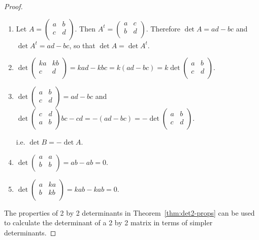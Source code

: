 \documentclass[11pt,a4paper]{article}
\theoremstyle{definition}
\begin{document}
\begin{proof}
\begin{enumerate}
\item Let $
A=
\begin{pmatrix}
a&b\\c&d\\
\end{pmatrix}
$. Then $A^t=
\begin{pmatrix}
a&c\\b&d\\
\end{pmatrix}
$. Therefore $\det A=ad-bc$ and $\det A^t=ad-bc$, so that $\det A=\det A^t$.
\item $\det
\begin{pmatrix}
ka&kb\\c&d\\
\end{pmatrix}
=kad-kbc=k(ad-bc)=
k\det
\begin{pmatrix}
a&b\\c&d\\
\end{pmatrix}
$.
\item $\det
\begin{pmatrix}
a&b\\c&d\\
\end{pmatrix}
=ad-bc
$ and $\det
\begin{pmatrix}
c&d\\a&b\\
\end{pmatrix}
bc-cd=-(ad-bc)=-\det
\begin{pmatrix}
a&b\\c&d\\
\end{pmatrix}
$.

i.e. $\det B=-\det A$.
\item $\det
\begin{pmatrix}
a&a\\b&b\\
\end{pmatrix}
=ab-ab=0
$.
\item $\det
\begin{pmatrix}
a&ka\\b&kb\\
\end{pmatrix}
=kab-kab=0$.
\end{enumerate}
The properties of  2 by 2 determinants in Theorem~\ref{thm:det2-props} can be used to calculate the determinant of a 2 by 2 matrix in terms of simpler determinants.
\end{proof}
\end{document}
